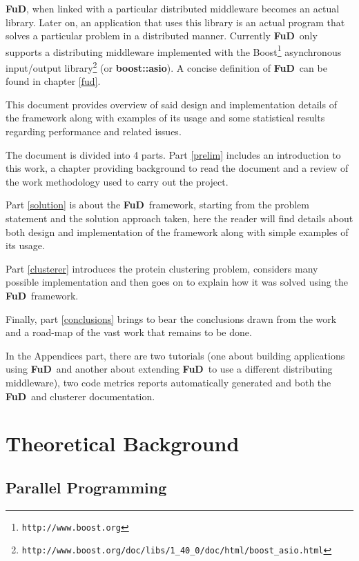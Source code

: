 \documentclass[a4paper,12pt,english]{report}
\newcommand{\fud}{\textbf{FuD}}
\begin{document}
\fud, when linked with a particular distributed middleware becomes an actual library. Later on, an application that uses this library is an actual program that solves a particular problem in a distributed manner. Currently \fud \ only supports a distributing middleware implemented with the Boost\footnote{\texttt{http://www.boost.org}} asynchronous input/output library\footnote{\texttt{http://www.boost.org/doc/libs/1\_40\_0/doc/html/boost\_asio.html}} (or \textbf{boost::asio}). A concise definition of \fud \ can be found in chapter \ref{fud}.


This document provides overview of said design and implementation details of the framework along with examples of its usage and some statistical results regarding performance and related issues. 

The document is divided into 4 parts. Part \ref{prelim} includes an introduction to this work, a chapter providing background to read the document and a review of the work methodology used to carry out the project. 

Part \ref{solution} is about the \fud \ framework, starting from the problem statement and the solution approach taken, here the reader will find details about both design and implementation of the framework along with simple examples of its usage. 

Part \ref{clusterer} introduces the protein clustering problem, considers many possible implementation and then goes on to explain how it was solved using the \fud \ framework.

Finally, part \ref{conclusions} brings to bear the conclusions drawn from the work and a road-map of the vast work that remains to be done.

In the Appendices part, there are two tutorials (one about building applications using \fud \ and another about extending \fud \ to use a different distributing middleware), two code metrics reports automatically generated and both the \fud \ and clusterer documentation. 

\chapter{Theoretical Background}

\section{Parallel Programming}
\end{document}
